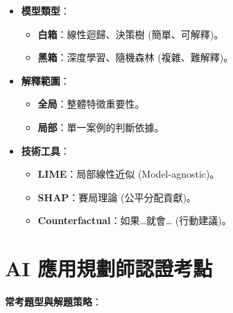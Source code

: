 \documentclass[
  letterpaper,
  DIV=11,
  numbers=noendperiod]{scrreprt}
\providecommand{\tightlist}{%
  \setlength{\itemsep}{0pt}\setlength{\parskip}{0pt}}
\begin{document}
\begin{itemize}
\tightlist
\item
  \textbf{模型類型}：

  \begin{itemize}
  \tightlist
  \item
    \textbf{白箱}：線性迴歸、決策樹 (簡單、可解釋)。
  \item
    \textbf{黑箱}：深度學習、隨機森林 (複雜、難解釋)。
  \end{itemize}
\item
  \textbf{解釋範圍}：

  \begin{itemize}
  \tightlist
  \item
    \textbf{全局}：整體特徵重要性。
  \item
    \textbf{局部}：單一案例的判斷依據。
  \end{itemize}
\item
  \textbf{技術工具}：

  \begin{itemize}
  \tightlist
  \item
    \textbf{LIME}：局部線性近似 (Model-agnostic)。
  \item
    \textbf{SHAP}：賽局理論 (公平分配貢獻)。
  \item
    \textbf{Counterfactual}：如果\ldots 就會\ldots{} (行動建議)。
  \end{itemize}
\end{itemize}

\section{AI
應用規劃師認證考點}\label{ai-ux61c9ux7528ux898fux5283ux5e2bux8a8dux8b49ux8003ux9ede-9}

\textbf{常考題型與解題策略}：
\end{document}
